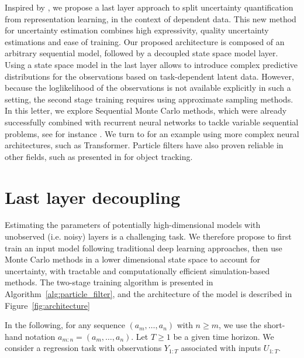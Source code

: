 \documentclass[journal]{IEEEtran}
\begin{document}
Inspired by \cite{Brosse2020OnLA}, we propose a last layer approach to split uncertainty quantification from representation learning, in the context of dependent data. This new method for uncertainty estimation combines high expressivity, quality uncertainty estimations and ease of training. Our proposed architecture is composed of an arbitrary sequential model, followed by a decoupled state space model layer. Using a state space model in the last layer allows to introduce complex predictive distributions for the observations based on task-dependent latent data. However, because the loglikelihood of the observations is not available explicitly in such a setting, the second stage training requires using approximate sampling methods. In this letter, we explore Sequential Monte Carlo methods, which were already successfully combined with recurrent neural networks to tackle variable sequential problems, see for instance \cite{naesseth2017variational,maddison2017filtering,Ma2020}.
We turn to \cite{Martin2020TheMC} for an example using more complex neural architectures, such as Transformer.
Particle filters have also proven reliable in other fields, such as presented in \cite{Liu2020LSTMPF} for object tracking.




\section{Last layer decoupling}
Estimating the parameters of potentially high-dimensional models with unobserved (i.e. noisy) layers is a challenging task.
We therefore propose to first train an input model following traditional deep learning approaches, then use Monte Carlo methods in a lower dimensional state space to account for uncertainty, with tractable and computationally efficient simulation-based methods.
The two-stage training algorithm is presented in Algorithm~\ref{alg:particle_filter}, and the architecture of the model is described in Figure~\ref{fig:architecture}

In the following, for any sequence $(a_m,\ldots, a_n)$ with $n\geq m$, we use the short-hand notation $a_{m:n} = (a_m,\ldots, a_n)$.
Let $T\ge 1$ be a given time horizon.
We consider a regression task with observations $Y_{1:T}$ associated with inputs $U_{1:T}$.
\end{document}
